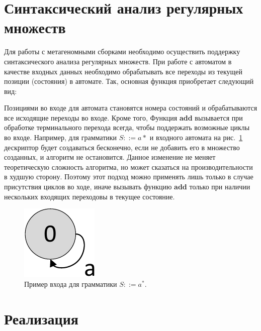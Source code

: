 \documentclass[14pt]{matmex-diploma-custom}
\begin{document}
	
	
	
	
	
	
    
    
    \section{Синтаксический анализ регулярных множеств}
    Для работы с метагеномными сборками необходимо осуществить поддержку синтаксического анализа регулярных множеств.
    При работе с автоматом в качестве входных данных необходимо обрабатывать все переходы из текущей позиции (состояния) в автомате.
    Так, основная функция приобретает следующий вид:
    
    Позициями во входе для автомата становятся номера состояний и обрабатываются все исходящие переходы во входе. Кроме того,    
    Функция \textbf{add} вызывается при обработке терминального перехода всегда, чтобы поддержать возможные циклы во входе.
    Например, для грамматики $S ::= a*$ и входного автомата на рис.~\ref{graphEx}
    дескриптор будет создаваться бесконечно, если не добавить его в множество созданных, и алгоритм не остановится.
    Данное изменение не меняет теоретическую сложность алгоритма, но может сказаться на производительности в худшую сторону.
    Поэтому этот подход можно применять лишь только в случае присутствия циклов во ходе, иначе вызывать функцию \textbf{add}
    только при наличии нескольких входящих переходовы в текущее состояние.
    
    \begin{figure}[ht]   
        \centering
        \includegraphics[scale=.5]{pictures/graphEx.pdf}
        \caption{Пример входа для грамматики $S ::= a^*$.}
        \label{graphEx}
    \end{figure}

    \section{Реализация}
    
\end{document}
